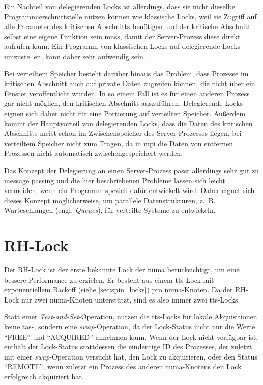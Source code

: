 Ein Nachteil von delegierenden Locks ist allerdings,
dass sie nicht dieselbe Programmierschnittstelle nutzen können
wie klassische Locks,
weil sie Zugriff auf alle Parameter des kritischen Abschnitts benötigen
und der kritische Abschnitt selbst eine eigene Funktion sein muss,
damit der Server-Prozess diese direkt aufrufen kann.
Ein Programm von klassischen Locks auf delegierende Locks umzustellen,
kann daher sehr aufwendig sein.

Bei verteiltem Speicher besteht darüber hinaus das Problem,
dass Prozesse im kritischen Abschnitt auch auf private Daten zugreifen können,
die nicht über ein \gls{Fenster} veröffentlicht wurden.
In so einem Fall ist es für einen anderen Prozess gar nicht möglich,
den kritischen Abschnitt auszuführen.
Delegierende Locks eignen sich daher nicht für eine Portierung auf verteilten Speicher.
Außerdem kommt der Hauptvorteil von delegierenden Locks,
dass die Daten des kritischen Abschnitts meist schon im \gls{Zwischenspeicher} des Server-Prozesses liegen,
bei verteiltem Speicher nicht zum Tragen,
da in \gls{mpi} die Daten von entfernen Prozessen nicht automatisch zwischengespeichert werden.

Das Konzept der Delegierung an einen Server-Prozess passt allerdings sehr gut zu \gls{message passing}
und die hier beschriebenen Probleme lassen sich leicht vermeiden,
wenn ein Programm speziell dafür entwickelt wird.
Daher eignet sich dieses Konzept möglicherweise,
um parallele Datenstrukturen,
z.~B. Warteschlangen (engl. \textit{Queues}),
für verteilte Systeme zu entwickeln.

\section{RH-Lock}
\label{sec:rh-lock}

Der RH-Lock \cite{RH-Lock} ist der erste bekannte Lock
der \gls{numa} berücksichtigt,
um eine bessere Performance zu erzielen.
Er besteht aus einem \gls{tts}-Lock \cite{TTS-Lock} mit exponentiellem Backoff \cite{backoff} (siehe \autoref{sec:spin_locks}) pro \gls{numa}-Knoten.
Da der RH-Lock nur zwei \gls{numa}-Knoten unterstützt,
sind es also immer zwei \gls{tts}-Locks.

Statt einer \textit{Test-and-Set}-Operation,
nutzen die \gls{tts}-Locks für lokale Akquisitionen keine \gls{tas}-,
sondern eine \textit{swap}-Operation,
da der Lock-Status nicht nur die Werte \enquote{FREE} und \enquote{ACQUIRED} annehmen kann.
Wenn der Lock nicht verfügbar ist,
enthält der Lock-Status stattdessen die eindeutige ID des Prozesses,
der zuletzt mit einer \textit{swap}-Operation versucht hat,
den Lock zu akquirieren,
oder den Status \enquote{REMOTE},
wenn zuletzt ein Prozess des anderen \gls{numa}-Knotens den Lock erfolgreich akquiriert hat.

